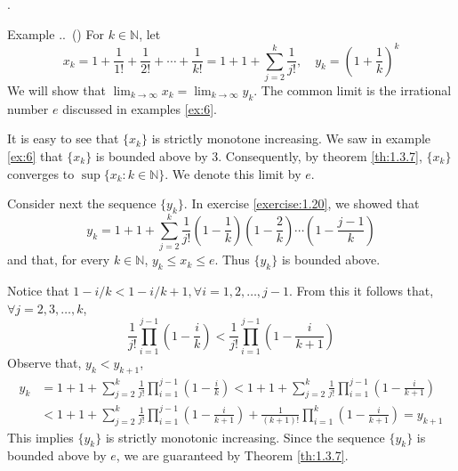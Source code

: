 \documentclass[8pt]{beamer}
\newcounter{ex}
\newcounter{exer}
\renewcommand{\theex}{\thesection.\thesubsection.\arabic{ex}}
\renewenvironment{example}[1][]{%
    \refstepcounter{ex}%
    \begin{exampleblock}{Example \theex\if\relax\detokenize{#1}\relax\else\ (#1)\fi}%
}{%
    \end{exampleblock}%
}
\newcommand{\mbb}[1]{\mathbb{#1}}
\begin{document}
\begin{frame}{.}
    \begin{example} \label{ex:1.3.8}
        For $k \in \mbb{N}$, let
        \begin{equation*}
            x_k = 1+ \frac{1}{1!} + \frac{1}{2!} + \cdots + \frac{1}{k!}= 1 + 1 + \sum_{j=2}^{k}\frac{1}{j!},\quad y_k = \left(1+\frac{1}{k}\right)^k
        \end{equation*}
        We will show that $\lim_{k \to \infty} x_k = \lim_{k \to \infty} y_k$.
        The common limit is the irrational number $e$ discussed in examples \ref{ex:6}.

        It is easy to see that $\{x_k\}$ is strictly monotone increasing.
        We saw in example \ref{ex:6} that $\{x_k\}$ is bounded above by $3$.
        Consequently, by theorem \ref{th:1.3.7}, $\{x_k\}$ converges to $\sup \{x_k: k \in \mbb{N}\}$.
        We denote this limit by $e$.

        Consider next the sequence $\{y_k\}$. In exercise \ref{exercise:1.20}, we showed that 
        \begin{equation} \label{eq:1}
            y_k = 1 + 1 + \sum^k_{j=2} \frac{1}{j!} \left(1 - \frac{1}{k}\right) \left(1 - \frac{2}{k}\right) \cdots \left(1 - \frac{j-1}{k}\right)
        \end{equation}
        and that, for every $k \in \mbb{N}$, $y_k \leq x_k \leq e$.
        Thus $\{y_k\}$ is bounded above.

        Notice that $1 - i/k < 1- i/{k+1}, \forall i=1,2,\dots,j-1$.
        From this it follows that, $\forall j=2,3,\dots, k$,
        \begin{equation*}
            \frac{1}{j!}\prod^{j-1}_{i=1} \left(1 - \frac{i}{k}\right) < \frac{1}{j!} \prod^{j-1}_{i=1}\left(1 - \frac{i}{k+1}\right)
        \end{equation*}
        Observe that, $y_k < y_{k+1}$,
        \begin{equation*}
            \begin{aligned}
                y_k &= 1+ 1+ \sum^k_{j=2}\frac{1}{j!} \prod_{i=1}^{j-1}\left(1 - \frac{i}{k}\right) < 1+ 1+ \sum_{j=2}^{k} \frac{1}{j!} \prod_{i=1}^{j-1}  \left(1 - \frac{i}{k+1}\right) \\
                &< 1+ 1+ \sum_{j=2}^k \frac{1}{j!} \prod_{i=1}^{j-1} \left(1 - \frac{i}{k+1}\right) + \frac{1}{(k+1)!}\prod_{i=1}^{k} \left(1 - \frac{i}{k+1}\right) = y_{k+1}
            \end{aligned}
        \end{equation*}
        This implies $\{y_k\}$ is strictly monotonic increasing.
        Since the sequence $\{y_k\}$ is bounded above by $e$, we are guaranteed by Theorem \ref{th:1.3.7}.
    \end{example}
\end{frame}
\end{document}
